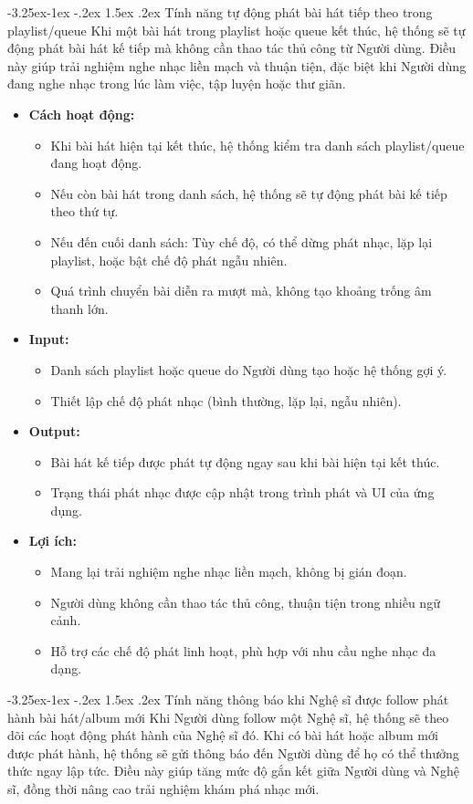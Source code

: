 \documentclass[a4paper]{article}
\makeatletter
\newcommand{\cach}{\hspace*{1.5em}\ignorespaces}
\newcounter {subsubsubsection}[subsubsection]
\newcommand\subsubsubsection{\@startsection{subsubsubsection}{4}{\z@}%
                                     {-3.25ex\@plus -1ex \@minus -.2ex}%
                                     {1.5ex \@plus .2ex}%
                                     {\normalfont\normalsize\bfseries}}
\makeatother
\begin{document}
\subsubsubsection{Tính năng tự động phát bài hát tiếp theo trong playlist/queue}
\cach Khi một bài hát trong playlist hoặc queue kết thúc, hệ thống sẽ tự động phát bài hát kế tiếp mà không cần thao tác thủ công từ Người dùng.
Điều này giúp trải nghiệm nghe nhạc liền mạch và thuận tiện, đặc biệt khi Người dùng đang nghe nhạc trong lúc làm việc, tập luyện hoặc thư giãn.

\begin{itemize}
	\item \textbf{Cách hoạt động:}
	      \begin{itemize}
		      \item Khi bài hát hiện tại kết thúc, hệ thống kiểm tra danh sách playlist/queue đang hoạt động.
		      \item Nếu còn bài hát trong danh sách, hệ thống sẽ tự động phát bài kế tiếp theo thứ tự.
		      \item Nếu đến cuối danh sách: Tùy chế độ, có thể dừng phát nhạc, lặp lại playlist, hoặc bật chế độ phát ngẫu nhiên.
		      \item Quá trình chuyển bài diễn ra mượt mà, không tạo khoảng trống âm thanh lớn.
	      \end{itemize}

	\item \textbf{Input:}
	      \begin{itemize}
		      \item Danh sách playlist hoặc queue do Người dùng tạo hoặc hệ thống gợi ý.
		      \item Thiết lập chế độ phát nhạc (bình thường, lặp lại, ngẫu nhiên).
	      \end{itemize}

	\item \textbf{Output:}
	      \begin{itemize}
		      \item Bài hát kế tiếp được phát tự động ngay sau khi bài hiện tại kết thúc.
		      \item Trạng thái phát nhạc được cập nhật trong trình phát và UI của ứng dụng.
	      \end{itemize}


	\item \textbf{Lợi ích:}
	      \begin{itemize}
		      \item Mang lại trải nghiệm nghe nhạc liền mạch, không bị gián đoạn.
		      \item Người dùng không cần thao tác thủ công, thuận tiện trong nhiều ngữ cảnh.
		      \item Hỗ trợ các chế độ phát linh hoạt, phù hợp với nhu cầu nghe nhạc đa dạng.
	      \end{itemize}
\end{itemize}
\subsubsubsection{Tính năng thông báo khi Nghệ sĩ được follow phát hành bài hát/album mới}
\cach Khi Người dùng follow một Nghệ sĩ, hệ thống sẽ theo dõi các hoạt động phát hành của Nghệ sĩ đó.
Khi có bài hát hoặc album mới được phát hành, hệ thống sẽ gửi thông báo đến Người dùng để họ có thể thưởng thức ngay lập tức.
Điều này giúp tăng mức độ gắn kết giữa Người dùng và Nghệ sĩ, đồng thời nâng cao trải nghiệm khám phá nhạc mới.
\end{document}
